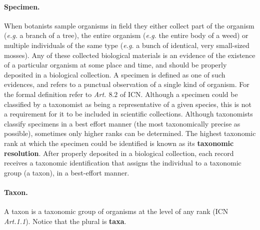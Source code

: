 \paragraph*{Specimen.}
When botanists sample organisms in field they either collect part of the organism (\textit{e.g.} a branch of a tree), the entire organism (\textit{e.g.} the entire body of a weed) or multiple individuals of the same type (\textit{e.g.} a bunch of identical, very small-sized mosses). 
Any of these collected biological materials is an evidence of the existence of a particular organism at some place and time, and should be properly deposited in a biological collection. A specimen is defined as one of such evidences, and refers to a punctual observation of a single kind of organism. For the formal definition refer to \textit{Art. $8.2$} of ICN. 
Although a specimen could be classified by a taxonomist as being a representative of a given species, this is not a requirement for it to be included in scientific collections. Although taxonomists classify specimens in a best effort manner (the most taxonomically precise as possible), sometimes only higher ranks can be determined. The highest taxonomic rank at which the specimen could be identified is known as its \textbf{taxonomic resolution}.
After properly deposited in a biological collection, each record receives a taxonomic identification that assigns the individual to a taxonomic group (a taxon), in a best-effort manner.

\paragraph*{Taxon.}

A taxon is a taxonomic group of organisms at the level of any rank (ICN \textit{Art.1.1}). Notice that the plural is \textbf{taxa}.







\cite{Bhattacharya2007}
